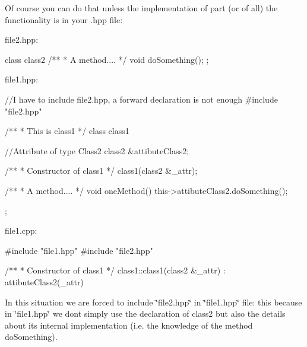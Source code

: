 Of course you can do that unless the implementation of part (or of all) the functionality is in your .hpp file\+: \begin{DoxyVerb}file2.hpp:

   class class2
   {
      /**
       * A method....
       */
      void doSomething();
   };

file1.hpp:

   //I have to include file2.hpp, a forward declaration is not enough
   #include "file2.hpp"

   /**
    * This is class1
    */
   class class1
   {
      //Attribute of type Class2
      class2 &attibuteClass2;

      /**
       * Constructor of class1
       */
      class1(class2 &_attr);

      /**
       * A method....
       */
      void oneMethod()   
      {
         this->attibuteClass2.doSomething();
      }
   };

file1.cpp:

   #include "file1.hpp"
   #include "file2.hpp"

   /**
    * Constructor of class1
    */
   class1::class1(class2 &_attr) : attibuteClass2(_attr){}
\end{DoxyVerb}
 In this situation we are forced to include \char`\"{}file2.\+hpp\char`\"{} in \char`\"{}file1.\+hpp\char`\"{} file\+: this because in \char`\"{}file1.\+hpp\char`\"{} we don\textquotesingle{}t simply use the declaration of class2 but also the details about its internal implementation (i.\+e. the knowledge of the method {\ttfamily do\+Something}).

